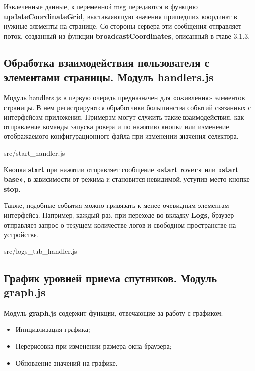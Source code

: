 Извлеченные данные, в переменной msg передаются в функцию \textbf{updateCoordinateGrid}, выставляющую значения пришедших координат в нужные элементы на странице. Со стороны сервера эти сообщения отправляет поток, созданный из функции \textbf{broadcastCoordinates}, описанный в главе 3.1.3.

\subsection{Обработка взаимодействия пользователя с элементами страницы. Модуль handlers.js} \label{subsect3_2_3}

Модуль handlers.js в первую очередь предназначен для «оживления» элементов страницы. В нем регистрируются обработчики большинства событий связанных с интерфейсом приложения. Примером могут служить такие взаимодействия, как отправление команды запуска ровера и по нажатию кнопки или изменение отображаемого конфигурационного файла при изменении значения селектора.


{src/start_handler.js}

Кнопка \textbf{start} при нажатии отправляет сообщение \textbf{«start rover»} или \textbf{«start base»}, в зависимости от режима и становится невидимой, уступив место кнопке \textbf{stop}.

Также, подобные события можно привязать к менее очевидным элементам интерфейса. Например, каждый раз, при переходе во вкладку \textbf{Logs}, браузер отправляет запрос о текущем количестве логов и свободном пространстве на устройстве.


{src/logs_tab_handler.js}

\subsection{График уровней приема спутников. Модуль graph.js} \label{subsect3_2_3}

Модуль \textbf{graph.js} содержит функции, отвечающие за работу с графиком:

\begin{itemize}
  \item Инициализация графика;
  \item Перерисовка при изменении размера окна браузера;
  \item Обновление значений на графике.
\end{itemize}

